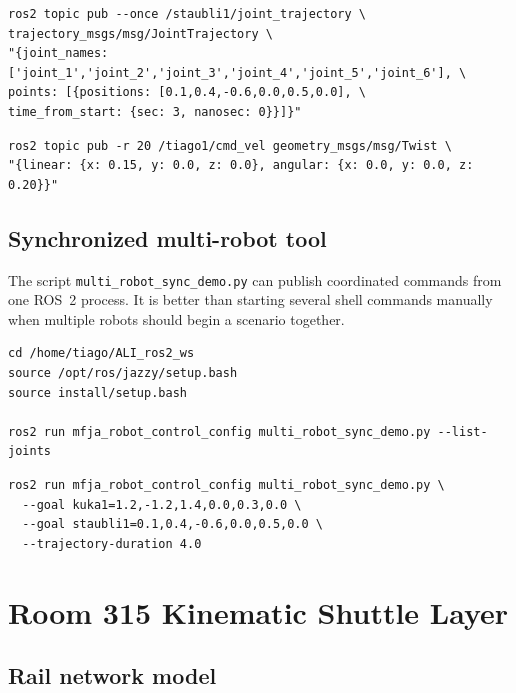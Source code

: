 \documentclass[12pt,a4paper]{report}
\newcommand{\codenext}[1]{\par\Needspace{#1\baselineskip}}
\begin{document}
\codenext{12}
\begin{lstlisting}[style=terminalcode,caption={Staeubli example command.}]
ros2 topic pub --once /staubli1/joint_trajectory \
trajectory_msgs/msg/JointTrajectory \
"{joint_names: ['joint_1','joint_2','joint_3','joint_4','joint_5','joint_6'], \
points: [{positions: [0.1,0.4,-0.6,0.0,0.5,0.0], \
time_from_start: {sec: 3, nanosec: 0}}]}"
\end{lstlisting}

\codenext{12}
\begin{lstlisting}[style=terminalcode,caption={TIAGo base example command.}]
ros2 topic pub -r 20 /tiago1/cmd_vel geometry_msgs/msg/Twist \
"{linear: {x: 0.15, y: 0.0, z: 0.0}, angular: {x: 0.0, y: 0.0, z: 0.20}}"
\end{lstlisting}

\section{Synchronized multi-robot tool}

The script \texttt{multi\_robot\_sync\_demo.py} can publish coordinated commands
from one ROS~2 process. It is better than starting several shell commands
manually when multiple robots should begin a scenario together.

\codenext{8}
\begin{lstlisting}[style=terminalcode,caption={Inspecting supported synchronized joints.}]
cd /home/tiago/ALI_ros2_ws
source /opt/ros/jazzy/setup.bash
source install/setup.bash

ros2 run mfja_robot_control_config multi_robot_sync_demo.py --list-joints
\end{lstlisting}

\codenext{10}
\begin{lstlisting}[style=terminalcode,caption={Coordinated motion for selected robots.}]
ros2 run mfja_robot_control_config multi_robot_sync_demo.py \
  --goal kuka1=1.2,-1.2,1.4,0.0,0.3,0.0 \
  --goal staubli1=0.1,0.4,-0.6,0.0,0.5,0.0 \
  --trajectory-duration 4.0
\end{lstlisting}

\chapter{Room 315 Kinematic Shuttle Layer}

\section{Rail network model}
\end{document}
